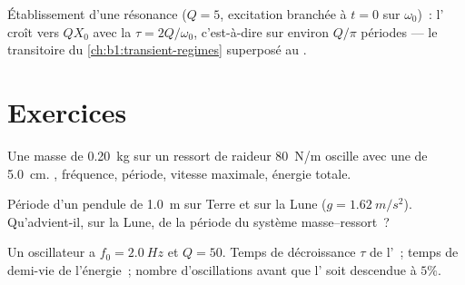 \begin{omfigure}

{\small Établissement d'une résonance ($Q = 5$, excitation branchée à
$t = 0$ sur $\omega_0$)~: l' croît vers $QX_0$ avec la  $\tau = 2Q/\omega_0$, c'est-à-dire sur environ $Q/\pi$ périodes
--- le transitoire du \cref{ch:b1:transient-regimes} superposé au .}
\end{omfigure}

\section{Exercices}

\begin{exercise}[$\star$]\label{exo:b1:oscillators-resonance:1}
Une masse de \qty{0.20}{kg} sur un ressort de raideur \qty{80}{N/m}
oscille avec une  de \qty{5.0}{cm}. , fréquence,
période, vitesse maximale, énergie totale.
\end{exercise}

\begin{exercise}[$\star$]\label{exo:b1:oscillators-resonance:2}
Période d'un pendule de \qty{1.0}{m} sur Terre et sur la Lune
($g = \qty{1.62}{m/s^2}$). Qu'advient-il, sur la Lune, de la période du
système masse--ressort~?
\end{exercise}

\begin{exercise}[$\star$]\label{exo:b1:oscillators-resonance:3}
Un oscillateur a $f_0 = \qty{2.0}{Hz}$ et $Q = 50$. Temps de
décroissance $\tau$ de l'~; temps de demi-vie de l'énergie~;
nombre d'oscillations avant que l' soit descendue à $5\%$.
\end{exercise}


